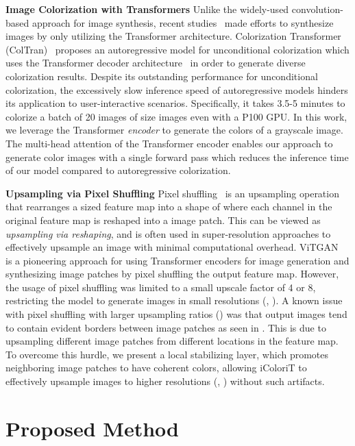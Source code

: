 \documentclass[10pt,twocolumn,letterpaper]{article}
\begin{document}
\vspace{+0.1cm}
\noindent \textbf{Image Colorization with Transformers} 
Unlike the widely-used convolution-based approach for image synthesis, recent studies~\cite{coltran, mae, simmim, vitgan} made efforts to synthesize images by only utilizing the Transformer architecture. 
Colorization Transformer (ColTran)~\cite{coltran} proposes an autoregressive model for unconditional colorization which uses the Transformer decoder architecture~\cite{attention} in order to generate diverse colorization results. 
Despite its outstanding performance for unconditional colorization, the excessively slow inference speed of autoregressive models hinders its application to user-interactive scenarios. 
Specifically, it takes 3.5-5 minutes to colorize a batch of 20 images of size  images even with a P100 GPU. 
In this work, we leverage the Transformer \textit{encoder} to generate the colors of a grayscale image. 
The multi-head attention of the Transformer encoder enables our approach to generate color images with a single forward pass which reduces the inference time of our model compared to autoregressive colorization. 


\noindent\textbf{Upsampling via Pixel Shuffling}
Pixel shuffling~\cite{pixelshuffle} is an upsampling operation that rearranges a  sized feature map into a shape of  where each channel in the original feature map is reshaped into a  image patch. 
This can be viewed as \emph{upsampling via reshaping}, and is often used in super-resolution approaches to effectively upsample an image with minimal computational overhead. 
ViTGAN~\cite{vitgan} is a pioneering approach for using Transformer encoders for image generation and synthesizing image patches by pixel shuffling the output feature map. 
However, the usage of pixel shuffling was limited to a small upscale factor of 4 or 8, restricting the model to generate images in small resolutions (\eg, ). 
A known issue~\cite{mae} with pixel shuffling with larger upsampling ratios () was that output images tend to contain evident borders between image patches as seen in . 
This is due to upsampling different image patches from different locations in the feature map. 
To overcome this hurdle, we present a local stabilizing layer, which promotes neighboring image patches to have coherent colors, allowing iColoriT to effectively upsample images to higher resolutions (\ie, ) without such artifacts. 

\vspace{-0.2cm}
\section{Proposed Method}
\end{document}
